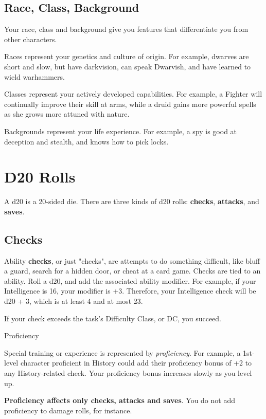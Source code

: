 \documentclass[letterpaper,twocolumn,openany,nodeprecatedcode,bg=print]{dndbook}
\begin{document}
\subsection{Race, Class, Background}
Your race, class and background give you features that differentiate you from other characters. 

Races represent your genetics and culture of origin. 
For example, dwarves are short and slow, but have darkvision, can speak Dwarvish, and have learned to wield warhammers. 

Classes represent your actively developed capabilities. 
For example, a Fighter will continually improve their skill at arms, 
while a druid gains more powerful spells as she grows more attuned with nature. 

Backgrounds represent your life experience. 
For example, a spy is good at deception and stealth, and knows how to pick locks. 


\newpage
\section{D20 Rolls}

A d20 is a 20-sided die. 
There are three kinds of d20 rolls: \textbf{checks}, \textbf{attacks}, and \textbf{saves}.

\subsection{Checks}
Ability \textbf{checks}, or just "checks", are attempts to do something difficult, 
like bluff a guard, search for a hidden door, or cheat at a card game. 
Checks are tied to an ability. 
Roll a d20, and add the associated ability modifier. 
For example, if your Intelligence is 16, your modifier is +3. 
Therefore, your Intelligence check will be d20 + 3, which is at least 4 and at most 23.

If your check exceeds the task's Difficulty Class, or DC, you succeed.

\begin{DndComment}{Proficiency}

\noindent Special training or experience is represented by \textit{proficiency}. 
For example, a 1st-level character proficient in History could add their proficiency bonus of +2 to any History-related check. 
Your proficiency bonus increases slowly as you level up.

\textbf{Proficiency affects only checks, attacks and saves}. 
You do not add proficiency to damage rolls, for instance.

\end{DndComment}
\end{document}
